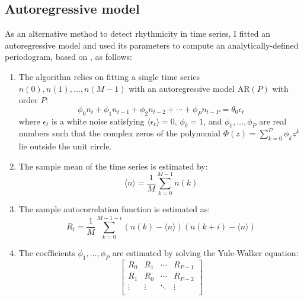 \subsection{Autoregressive model}
\label{subsec:methods-computational-ar}

As an alternative method to detect rhythmicity in time series, I fitted an autoregressive model and used its parameters to compute an analytically-defined periodogram, based on \textcite{jiaFrequencyDomainAnalysis2020}, as follows:

\begin{enumerate}
  \item The algorithm relies on fitting a single time series $n(0), n(1), \ldots , n(M-1)$ with an autoregressive model $\mathrm{AR}(P)$ with order $P$:
        \begin{equation}
          \label{eq:ar-model}
          \phi_{0}n_{t} + \phi_{1}n_{t-1} + \phi_{2}n_{t-2} + \cdots + \phi_{P}n_{t-P} = \theta_{0}\epsilon_{t}
        \end{equation}
        where $\epsilon_{t}$ is a white noise satisfying $\langle \epsilon_{t} \rangle = 0$,
        $\phi_{0} = 1$, and
        $\phi_{1}, \ldots , \phi_{P}$ are real numbers such that the complex zeros of the polynomial $\Phi (z) = \sum_{k=0}^{P} \phi_{k}z^{k}$ lie outside the unit circle.
  \item The sample mean of the time series is estimated by:
        \begin{equation}
          \label{eq:ar-mean}
          \langle n \rangle = \frac{1}{M} \sum_{k=0}^{M-1}n(k)
        \end{equation}
  \item The sample autocorrelation function is estimated as:
        \begin{equation}
          \label{eq:ar-acf}
          R_{i} = \frac{1}{M} \sum_{k=0}^{M-1-i}(n(k) - \langle n \rangle)(n(k+i) - \langle n \rangle)
        \end{equation}
  \item The coefficients $\phi_{1}, \ldots , \phi_{P}$ are estimated by solving the Yule-Walker equation:
        \begin{equation}
          \label{eq:ar-yule-walker}
          \begin{bmatrix}
            R_{0} & R_{1} & \cdots & R_{P-1} \\
            R_{1} & R_{0} & \cdots & R_{P-2} \\
            \vdots & \vdots & \ddots & \vdots \\

\end{bmatrix}
\end{equation}
\end{enumerate}
